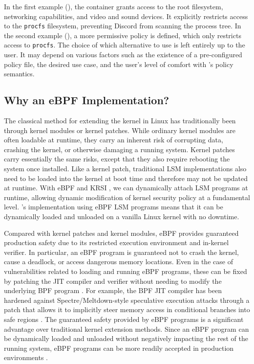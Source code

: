 In the first example (), the container grants access to the root filesystem, networking capabilities, and video and sound devices. It explicitly restricts access to the \texttt{procfs} filesystem, preventing Discord from scanning the process tree. In the second example (), a more permissive policy is defined, which only restricts access to \texttt{procfs}. The choice of which alternative to use is left entirely up to the user. It may depend on various factors such as the existence of a pre-configured policy file, the desired use case, and the user's level of comfort with \bpfcontain{}'s policy semantics.

\subsection{Why an eBPF Implementation?}%
\label{sub:why_ebpf}

The classical method for extending the kernel in Linux has traditionally been through kernel modules or kernel patches. While ordinary kernel modules are often loadable at runtime, they carry an inherent risk of corrupting data, crashing the kernel, or otherwise damaging a running system. Kernel patches carry essentially the same risks, except that they also require rebooting the system once installed. Like a kernel patch, traditional LSM implementations also need to be loaded into the kernel at boot time and therefore may not be updated at runtime. With eBPF and KRSI \cite{singh2019_krsi,corbet2019_krsi}, we can dynamically attach LSM programs at runtime, allowing dynamic modification of kernel security policy at a fundamental level. \bpfcontain{}'s implementation using eBPF LSM programs means that it can be dynamically loaded and unloaded on a vanilla Linux kernel with no downtime.

Compared with kernel patches and kernel modules, eBPF provides guaranteed production safety due to its restricted execution environment and in-kernel verifier. In particular, an eBPF program is guaranteed not to crash the kernel, cause a deadlock, or access dangerous memory locations. Even in the case of vulnerabilities related to loading and running eBPF programs, these can be fixed by patching the JIT compiler and verifier without needing to modify the underlying BPF program \cite{gregg2019_bpf}. For example, the BPF JIT compiler has been hardened against Spectre/Meltdown-style speculative execution attacks \cite{kocher2019_spectre} through a patch that allows it to implicitly steer memory access in conditional branches into safe regions \cite{starovoitov2020_safe}. The guaranteed safety provided by eBPF programs is a significant advantage over traditional kernel extension methods. Since an eBPF program can be dynamically loaded and unloaded without negatively impacting the rest of the running system, eBPF programs can be more readily accepted in production environments \cite{gregg2019_bpf}.

